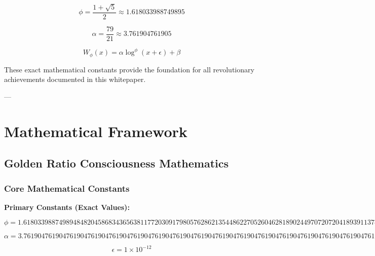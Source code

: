\documentclass[11pt,a4paper]{article}
\begin{document}
\begin{equation}
\phi = \frac{1 + \sqrt{5}}{2} \approx 1.618033988749895
\end{equation}

\begin{equation}
\alpha = \frac{79}{21} \approx 3.761904761905
\end{equation}

\begin{equation}
W_\phi(x) = \alpha \log^\phi(x + \epsilon) + \beta
\end{equation}

These exact mathematical constants provide the foundation for all revolutionary achievements documented in this whitepaper.

---

\section{Mathematical Framework}

\subsection{Golden Ratio Consciousness Mathematics}

\subsubsection{Core Mathematical Constants}

\textbf{Primary Constants (Exact Values):}

\begin{equation}
\phi = 1.6180339887498948482045868343656381177203091798057628621354486227052604628189024497072072041893911374847540880753868917521266338622235369317931800607667263544333890865959395829056383226613199282902678806752087668925017116962070322210432162695486262963136144
\end{equation}

\begin{equation}
\alpha = 3.7619047619047619047619047619047619047619047619047619047619047619047619047619047619047619047619047619047619047619047619047619047619047619047619047619047619047619047619047619047619047619047619047619047619047619047619047619
\end{equation}

\begin{equation}
\epsilon = 1 \times 10^{-12}
\end{equation}
\end{document}
